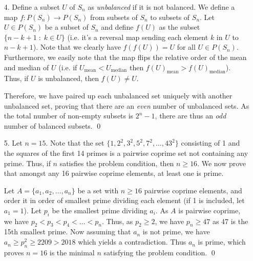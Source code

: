 \documentclass[a4paper, 12pt]{article}
\begin{document}
\begin{enumerate}
    
    \newpage
    \item[4.]  Define a subset $U$ of $S_n$ as \textit{unbalanced} if it is not balanced. We define a map $f : P(S_n) \to P(S_n)$ from subsets of $S_n$ to subsets of $S_n$. Let $U \in P(S_n)$ be a subset of $S_n$ and define $f(U)$ as the subset  $\{ n -k+1 \;:\; k \in U  \}$ (i.e. it's a reversal map sending each element $k$ in $U$ to $n-k+1$). Note that we clearly have $f(f(U)) = U$ for all $U \in P(S_n)$. Furthermore, we easily note that the map flips the relative order of the mean and median of $U$ (i.e. if $U_\textrm{mean} < U_\textrm{median}$ then $f(U)_\textrm{mean} > f(U)_\textrm{median}$). Thus, if $U$ is unbalanced, then $f(U) \not = U$.

    Therefore, we have paired up each unbalanced set uniquely with another unbalanced set, proving that there are an \textit{even} number of unbalanced sets. As the total number of non-empty subsets is $2^n-1$, there are thus an \textit{odd} number of balanced subsets. \qed \\
    \vspace{5mm}
    
    \item[5.]  Let $n = 15$. Note that the set $\{1, 2^2, 3^2, 5^2, 7^2, \dots, 43^2 \}$ consisting of 1 and the squares of the first 14 primes is a pairwise coprime set not containing any prime. Thus, if $n$ satisfies the problem condition, then $n \geq 16$.  We now prove that amongst any 16 pairwise coprime elements, at least one is prime. 

    Let $A = \{a_1, a_2, \dots, a_n\}$ be a set with $n \geq 16$ pairwise coprime elements, and order it in order of smallest prime dividing each element (if 1 is included, let $a_1 = 1$). Let $p_i$ be the smallest prime dividing $a_i$. As $A$ is pairwise coprime, we have $p_2 < p_3 < p_4 < \dots < p_n$. Thus, as $p_2 \geq 2$, we have $p_n \geq 47$ as 47 is the 15th smallest prime. Now assuming that $a_n$ is not prime, we have $a_n \geq p_n^2 \geq 2209 > 2018$ which yields a contradiction. Thus $a_n$ is prime, which proves $n = 16$ is the minimal $n$ satisfying the problem condition. \qed

    

\end{enumerate}
\end{document}
